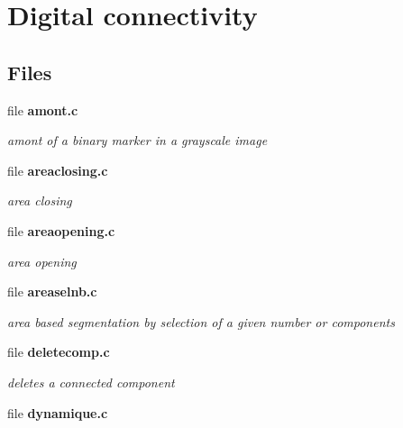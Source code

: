 \section{Digital connectivity}
\label{group__connect}
\subsection*{Files}
\begin{DoxyCompactItemize}
\item 
file {\bf amont.c}


\begin{DoxyCompactList}\small\item\em amont of a binary marker in a grayscale image \item\end{DoxyCompactList}

\item 
file {\bf areaclosing.c}


\begin{DoxyCompactList}\small\item\em area closing \item\end{DoxyCompactList}

\item 
file {\bf areaopening.c}


\begin{DoxyCompactList}\small\item\em area opening \item\end{DoxyCompactList}

\item 
file {\bf areaselnb.c}


\begin{DoxyCompactList}\small\item\em area based segmentation by selection of a given number or components \item\end{DoxyCompactList}

\item 
file {\bf deletecomp.c}


\begin{DoxyCompactList}\small\item\em deletes a connected component \item\end{DoxyCompactList}

\item 
file {\bf dynamique.c}



\end{DoxyCompactItemize}
